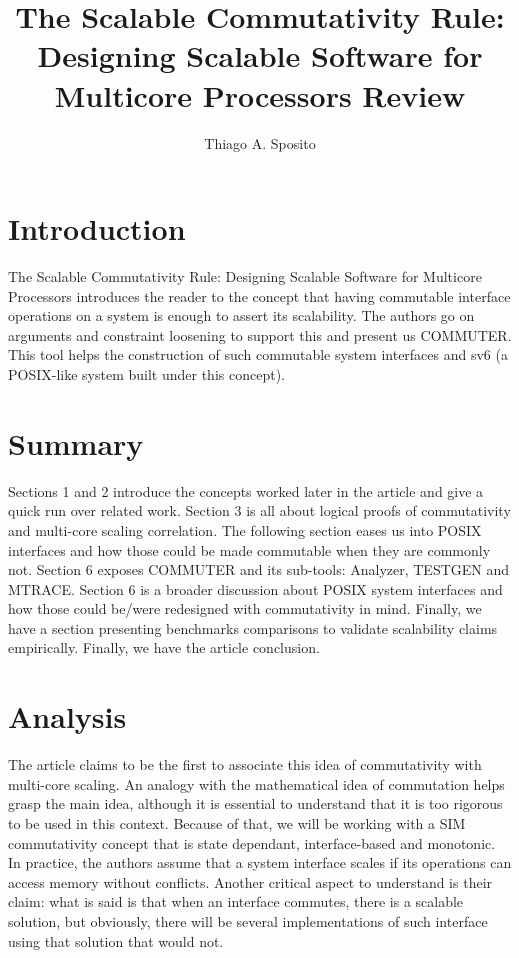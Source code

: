 \documentclass[12pt]{article}
\title{The Scalable Commutativity Rule: Designing Scalable Software for Multicore Processors Review}
\author{Thiago A. Sposito\inst{1} }
\begin{document}
 

\maketitle


\section{Introduction}
The Scalable Commutativity Rule: Designing Scalable Software for Multicore Processors \cite{clements2015scalable} introduces the reader to the concept that having commutable interface operations on a system is enough to assert its scalability. The authors go on arguments and constraint loosening to support this and present us COMMUTER. This tool helps the construction of such commutable system interfaces and sv6 (a POSIX-like system built under this concept).


\section{Summary} 
Sections 1 and 2 introduce the concepts worked later in the article and give a quick run over related work. Section 3 is all about logical proofs of commutativity and multi-core scaling correlation. The following section eases us into POSIX interfaces and how those could be made commutable when they are commonly not. Section 6 exposes COMMUTER and its sub-tools: Analyzer, TESTGEN and MTRACE. Section 6 is a broader discussion about POSIX system interfaces and how those could be/were redesigned with commutativity in mind. Finally, we have a section presenting benchmarks comparisons to validate scalability claims empirically. Finally, we have the article conclusion.


\section{Analysis}
The article claims to be the first to associate this idea of commutativity with multi-core scaling. An analogy with the mathematical idea of commutation helps grasp the main idea, although it is essential to understand that it is too rigorous to be used in this context. Because of that, we will be working with a SIM commutativity concept that is state dependant, interface-based and monotonic. In practice, the authors assume that a system interface scales if its operations can access memory without conflicts. Another critical aspect to understand is their claim: what is said is that when an interface commutes, there is a scalable solution, but obviously, there will be several implementations of such interface using that solution that would not.
\end{document}
